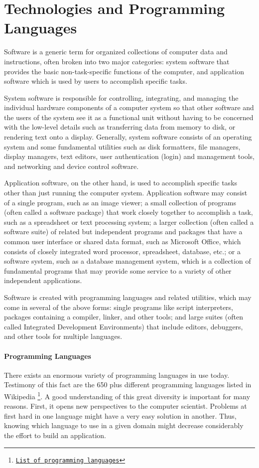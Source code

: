 \section{Technologies and Programming Languages}

Software is a generic term for organized collections of computer data and instructions, often broken into two major categories: system software that provides the basic non-task-specific functions of the computer, and application software which is used by users to accomplish specific tasks.

System software is responsible for controlling, integrating, and managing the individual hardware components of a computer system so that other software and the users of the system see it as a functional unit without having to be concerned with the low-level details such as transferring data from memory to disk, or rendering text onto a display. Generally, system software consists of an operating system and some fundamental utilities such as disk formatters, file managers, display managers, text editors, user authentication (login) and management tools, and networking and device control software.

Application software, on the other hand, is used to accomplish specific tasks other than just running the computer system. Application software may consist of a single program, such as an image viewer; a small collection of programs (often called a software package) that work closely together to accomplish a task, such as a spreadsheet or text processing system; a larger collection (often called a software suite) of related but independent programs and packages that have a common user interface or shared data format, such as Microsoft Office, which consists of closely integrated word processor, spreadsheet, database, etc.; or a software system, such as a database management system, which is a collection of fundamental programs that may provide some service to a variety of other independent applications.

Software is created with programming languages and related utilities, which may come in several of the above forms: single programs like script interpreters, packages containing a compiler, linker, and other tools; and large suites (often called Integrated Development Environments) that include editors, debuggers, and other tools for multiple languages. 


\paragraph*{Programming Languages}
\hfill \break
There exists an enormous variety of programming languages in use today. Testimony of this fact are the 650 plus different programming languages listed in Wikipedia \footnote{\href{http://en.wikipedia.org/wiki/List_of_programming_languages}{\texttt{List of programming languages}}}. A good understanding of this great diversity is important for many reasons. First, it opens new perspectives to the computer scientist. Problems at first hard in one language might have a very easy solution in another. Thus, knowing which language to use in a given domain might decrease considerably the effort to build an application.



